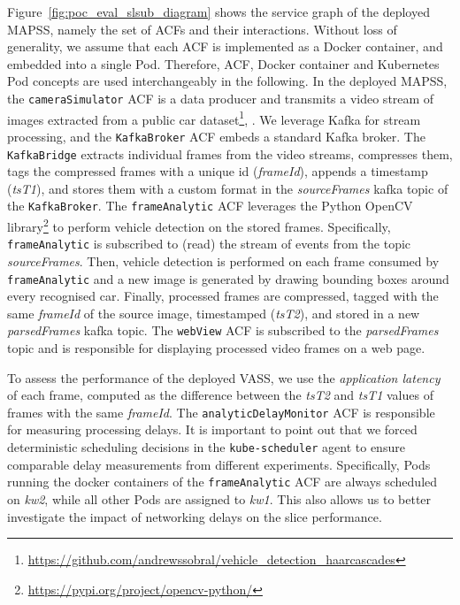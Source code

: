 Figure~\ref{fig:poc_eval_slsub_diagram} shows the service graph of the deployed MAPSS, namely the set of ACFs and their interactions. Without loss of generality, we assume that each ACF is implemented as a Docker container, and embedded into a single Pod. Therefore, ACF, Docker container and Kubernetes Pod concepts are used interchangeably in the following. In the deployed MAPSS, the \texttt{cameraSimulator} ACF is a data producer and transmits a video stream of images extracted from a public car dataset\footnote{\url{https://github.com/andrewssobral/vehicle_detection_haarcascades}}, . We leverage Kafka for stream processing, and the \texttt{KafkaBroker} ACF embeds a standard Kafka broker. The \texttt{KafkaBridge} extracts individual frames from the video streams, compresses them, tags the compressed frames with a unique id (\textit{frameId}), appends a timestamp (\textit{tsT1}), and stores them with a custom  format in the \textit{sourceFrames} kafka topic of the \texttt{KafkaBroker}.  The \texttt{frameAnalytic} ACF leverages the Python OpenCV library\footnote{\url{https://pypi.org/project/opencv-python/}} to perform vehicle detection on the stored frames. Specifically, \texttt{frameAnalytic} is subscribed to (read) the stream of events from the topic \textit{sourceFrames}. Then, vehicle detection is performed on each frame consumed by \texttt{frameAnalytic} and a new image is generated by drawing bounding boxes around every recognised car. Finally, processed frames are compressed, tagged with the same \textit{frameId} of the source image, timestamped (\textit{tsT2}), and stored in a new \textit{parsedFrames} kafka topic. The \texttt{webView} ACF is subscribed to the \textit{parsedFrames} topic and is responsible for displaying processed video frames on a web page. 
 
 To assess the performance of the deployed VASS, we use the \textit{application latency} of each frame, computed as the difference between the \textit{tsT2} and \textit{tsT1} values of frames with the same \textit{frameId}. The \texttt{analyticDelayMonitor} ACF is responsible for measuring processing delays. It is important to point out that we forced deterministic scheduling decisions in the \texttt{kube-scheduler} agent to ensure comparable delay measurements from different experiments. Specifically, Pods running the docker containers of the \texttt{frameAnalytic} ACF are always scheduled on \textit{kw2}, while all other Pods are assigned to \textit{kw1}. This also allows us to better investigate the impact of networking delays on the slice performance. 
%
